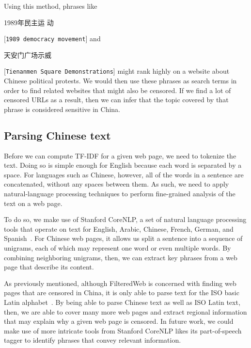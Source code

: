 Using this method, phrases like \begin{CJK*}{UTF8}{gbsn}1989年民主运
动\end{CJK*} [\texttt{1989 democracy movement}]
and \begin{CJK*}{UTF8}{gbsn}天安门广场示威\end{CJK*}
[\texttt{Tienanmen Square Demonstrations}] might rank highly on a
website about Chinese political protests. We would then use these phrases
as search terms in order to find related websites that might also be
censored. If we find a lot of censored URLs as a result, then we can
infer that the topic covered by that phrase is considered sensitive in China.

\subsection{Parsing Chinese text}
Before we can compute TF-IDF for a given web page, we need to tokenize the
text. Doing so is simple enough for English because each word is separated by a
space. For languages such as Chinese, however, all of the words in a sentence are
concatenated, without any spaces between them. As such, we need to apply
natural-language processing techniques to perform fine-grained analysis
of the text on a web page.

To do so, we make use of Stanford CoreNLP, a set of natural language
processing tools that operate on text for English, Arabic, Chinese, French,
German, and Spanish~\cite{corenlp2016suite}. For Chinese web pages, it allows us
split a sentence into a sequence of unigrams, each of which may represent
one word or even multiple words. By combining neighboring unigrams, then, we
can extract key phrases from a web page that describe its content.

As previously mentioned, although FilteredWeb is concerned with finding web pages
that are censored in China, it is only able to parse text for the ISO basic
Latin alphabet~\cite{darer2017filteredweb}. By being able to parse Chinese text as
well as ISO Latin text, then, we are able to cover many more web pages and
extract regional information that may explain why a given web page is
censored. In future work, we could make use of more intricate tools
from Stanford CoreNLP likes its part-of-speech tagger to identify
phrases that convey relevant information.
